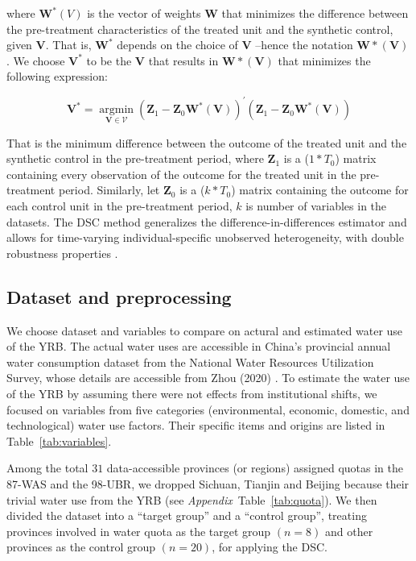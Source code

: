 where $\mathbf{W}^{*}(V)$ is the vector of weights $\mathbf{W}$ that minimizes the difference between the pre-treatment characteristics of the treated unit and the synthetic control, given $\mathbf{V}$. That is, $\mathbf{W^{*}}$ depends on the choice of $\mathbf{V}$ –hence the notation $\mathbf{W*(V)}$. We choose $\mathbf{V^{*}}$ to be the $\mathbf{V}$ that results in $\mathbf{W*(V)}$ that minimizes the following expression:

\begin{equation}
    \mathbf{V}^{*}=\underset{\mathbf{V} \in \mathcal{V}}{\operatorname{argmin}}\left(\mathbf{Z}_{1}-\mathbf{Z}_{0} \mathbf{W}^{*}(\mathbf{V})\right)^{\prime}\left(\mathbf{Z}_{1}-\mathbf{Z}_{0} \mathbf{W}^{*}(\mathbf{V})\right)
\end{equation}

That is the minimum difference between the outcome of the treated unit and the synthetic control in the pre-treatment period, where $\mathbf{Z}_{1}$ is a ($1*T_0$) matrix containing every observation of the outcome for the treated unit in the pre-treatment period. Similarly, let $\mathbf{Z}_{0}$ is a ($k * T_0$) matrix containing the outcome for each control unit in the pre-treatment period, $k$ is number of variables in the datasets.
The DSC method generalizes the difference-in-differences estimator and allows for time-varying individual-specific unobserved heterogeneity, with double robustness properties \cite{billmeier2013, smith2015}.

\subsection{Dataset and preprocessing}\label{sec:dataset}
We choose dataset and variables to compare on actural and estimated water use of the YRB.
The actual water uses are accessible in China’s provincial annual water consumption dataset from the National Water Resources Utilization Survey, whose details are accessible from Zhou (2020) \cite{zhou2020}.
To estimate the water use of the YRB by assuming there were not effects from institutional shifts, we focused on variables from five categories (environmental, economic, domestic, and technological) water use factors. Their specific items and origins are listed in Table~\ref{tab:variables}.

Among the total $31$ data-accessible provinces (or regions) assigned quotas in the 87-WAS and the 98-UBR, we dropped Sichuan, Tianjin and Beijing because their trivial water use from the YRB (see \textit{Appendix}~Table~\ref{tab:quota}). We then divided the dataset into a ``target group'' and a ``control group'', treating provinces involved in water quota as the target group $(n=8)$ and other provinces as the control group $(n=20)$, for applying the DSC.

